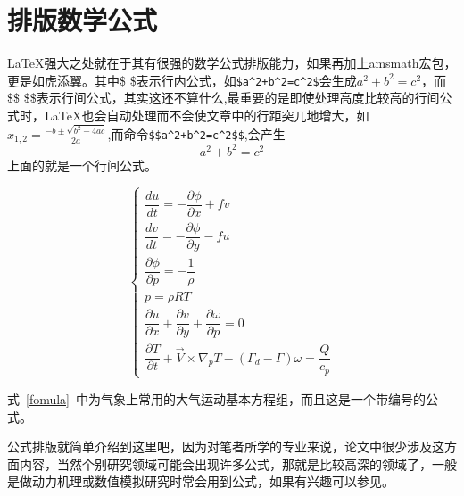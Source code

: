 \section{排版数学公式}

\LaTeX 强大之处就在于其有很强的数学公式排版能力，如果再加上amsmath宏包，更是如虎添翼。其中\$  \$表示行内公式，如\verb|$a^2+b^2=c^2$|会生成$a^2+b^2=c^2$，而\$\$  \$\$表示行间公式，其实这还不算什么,最重要的是即使处理高度比较高的行间公式时，\LaTeX 也会自动处理而不会使文章中的行距突兀地增大，如$x_{1,2}= \frac{-b\pm \sqrt{b^2-4ac}}{2a}$,而命令\verb|$$a^2+b^2=c^2$$|,会产生$$a^2+b^2=c^2$$
上面的就是一个行间公式。

\begin{equation}\label{fomula}
    \begin{cases}
        \dfrac{du}{dt}=-\dfrac{\partial \phi}{\partial x}+fv \\[1.5ex]
        \dfrac{dv}{dt}=-\dfrac{\partial \phi}{\partial y}-fu \\[1.5ex]
        \dfrac{\partial \phi}{\partial p}=-\dfrac{1}{\rho}   \\[1.5ex]
        p= \rho RT                                           \\[1.5ex]
        \dfrac{\partial u}{\partial x}+\dfrac{\partial v}{\partial y}+
        \dfrac{\partial \omega}{\partial p}=0                \\[1.5ex]
        \dfrac{\partial T}{\partial t}+\overrightarrow{V}\times \nabla_pT-(\Gamma_d-\Gamma)\omega=\dfrac{Q}{c_p}
    \end{cases}
\end{equation}

式~\ref{fomula}~中为气象上常用的大气运动基本方程组，而且这是一个带编号的公式。

公式排版就简单介绍到这里吧，因为对笔者所学的专业来说，论文中很少涉及这方面内容，当然个别研究领域可能会出现许多公式，那就是比较高深的领域了，一般是做动力机理或数值模拟研究时常会用到公式，如果有兴趣可以参见\cite{x1}。
